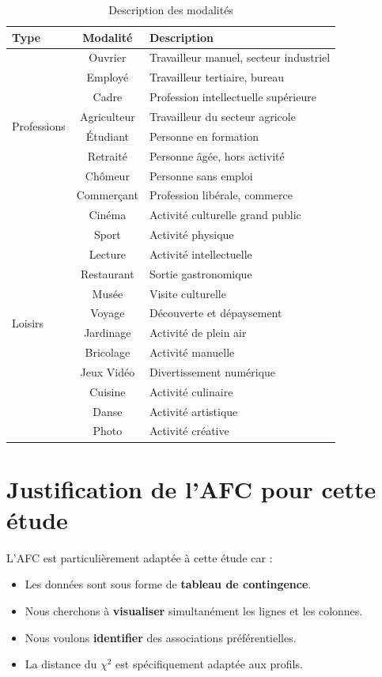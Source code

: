 \documentclass[12pt,a4paper]{book}
\begin{document}
	\begin{table}[H]
		\centering
		\caption{Description des modalités}
		\begin{tabular}{lcp{8cm}}
			\toprule
			\textbf{Type} & \textbf{Modalité} & \textbf{Description} \\
			\midrule
			\multirow{8}{*}{Professions} & Ouvrier & Travailleur manuel, secteur industriel \\
			& Employé & Travailleur tertiaire, bureau \\
			& Cadre & Profession intellectuelle supérieure \\
			& Agriculteur & Travailleur du secteur agricole \\
			& Étudiant & Personne en formation \\
			& Retraité & Personne âgée, hors activité \\
			& Chômeur & Personne sans emploi \\
			& Commerçant & Profession libérale, commerce \\
			\midrule
			\multirow{12}{*}{Loisirs} & Cinéma & Activité culturelle grand public \\
			& Sport & Activité physique \\
			& Lecture & Activité intellectuelle \\
			& Restaurant & Sortie gastronomique \\
			& Musée & Visite culturelle \\
			& Voyage & Découverte et dépaysement \\
			& Jardinage & Activité de plein air \\
			& Bricolage & Activité manuelle \\
			& Jeux Vidéo & Divertissement numérique \\
			& Cuisine & Activité culinaire \\
			& Danse & Activité artistique \\
			& Photo & Activité créative \\
			\bottomrule
		\end{tabular}
	\end{table}
	
	\section{Justification de l'AFC pour cette étude}
	
	L'AFC est particulièrement adaptée à cette étude car :
	
	\begin{itemize}
		\item Les données sont sous forme de \textbf{tableau de contingence}.
		\item Nous cherchons à \textbf{visualiser} simultanément les lignes et les colonnes.
		\item Nous voulons \textbf{identifier} des associations préférentielles.
		\item La distance du $\chi^2$ est spécifiquement adaptée aux profils.
	\end{itemize}
	
\end{document}
